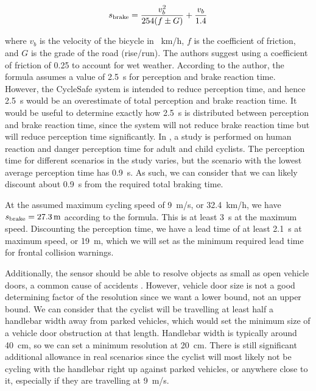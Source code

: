 \documentclass[journal]{IEEEtran}
\begin{document}
\begin{align}
    s_\text{brake} = \frac{v_b^2}{254(f \pm G)} + \frac{v_b}{1.4}
\end{align}

where $v_b$ is the velocity of the bicycle in \SI{}{\km/\hour}, $f$ is the coefficient of friction, and $G$ is the grade of the road (rise/run). The authors suggest using a coefficient of friction of 0.25 to account for wet weather. According to the author, the formula assumes a value of \SI{2.5}{\s} for perception and brake reaction time. However, the CycleSafe system is intended to reduce perception time, and hence \SI{2.5}{\s} would be an overestimate of total perception and brake reaction time. It would be useful to determine exactly how \SI{2.5}{\s} is distributed between perception and brake reaction time, since the system will not reduce brake reaction time but will reduce perception time significantly. In \cite{reaction-time}, a study is performed on human reaction and danger perception time for adult and child cyclists. The perception time for different scenarios in the study varies, but the scenario with the lowest average perception time has \SI{0.9}{\s}. As such, we can consider that we can likely discount about \SI{0.9}{\s} from the required total braking time.

At the assumed maximum cycling speed of \SI{9}{\meter/\s}, or \SI{32.4}{\km/\hour}, we have $s_\text{brake} = \SI{27.3}{\meter}$ according to the formula. This is at least \SI{3}{\s} at the maximum speed. Discounting the perception time, we have a lead time of at least \SI{2.1}{\s} at maximum speed, or \SI{19}{\meter}, which we will set as the minimum required lead time for frontal collision warnings.

Additionally, the sensor should be able to resolve objects as small as open vehicle doors, a common cause of accidents \cite{biking_cases}. However, vehicle door size is not a good determining factor of the resolution since we want a lower bound, not an upper bound. We can consider that the cyclist will be travelling at least half a handlebar width away from parked vehicles, which would set the minimum size of a vehicle door obstruction at that length. Handlebar width is typically around \SI{40}{\cm}, so we can set a minimum resolution at \SI{20}{\cm}. There is still significant additional allowance in real scenarios since the cyclist will most likely not be cycling with the handlebar right up against parked vehicles, or anywhere close to it, especially if they are travelling at \SI{9}{\meter/\s}.
\end{document}
